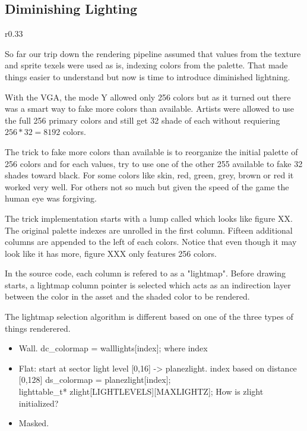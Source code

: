 \subsection{Diminishing Lighting}
\label{diminishedlightning}
\begin{wrapfigure}[11]{r}{0.33\textwidth}
\centering
{}
\end{wrapfigure}
So far our trip down the rendering pipeline assumed that values from the texture and sprite texels were used as is, indexing colors from the palette. That made things easier to understand but now is time to introduce diminished lightning.\\
\par
With the VGA, the mode Y allowed only 256 colors but as it turned out there was a smart way to fake more colors than available. Artists were allowed to use the full 256 primary colors and still get 32 shade of each without requiering $256 * 32 = 8192$ colors.\\
\par
 The trick to fake more colors than available is to reorganize the initial palette of 256 colors and for each values, try to use one of the other 255 available to fake 32 shades toward black. For some colors like skin, red, green, grey, brown or red it worked very well. For others not so much but given the speed of the game the human eye was forgiving.\\
 \par
 The trick implementation starts with a lump called  which looks like figure XX. The original palette indexes are unrolled in the first column. Fifteen additional columns are appended to the left of each colors. Notice that even though it may look like it has more, figure XXX only features 256 colors.\\
\par
In the source code, each column is refered to as a "lightmap". Before drawing starts, a lightmap column pointer is selected which acts as an indirection layer between the color in the asset and the shaded color to be rendered.\\
\par
{}
\par
The lightmap selection algorithm is different based on one of the three types of things renderered.\\
\par
\begin{itemize}
\item Wall. dc\_colormap = walllights[index]; where index 
\item Flat: start at sector light level [0,16] -> planezlight. index based on distance [0,128] ds\_colormap = planezlight[index];\\ lighttable\_t*    zlight[LIGHTLEVELS][MAXLIGHTZ]; How is zlight initialized?
\item Masked.
\end{itemize}
\par
{}
\par




